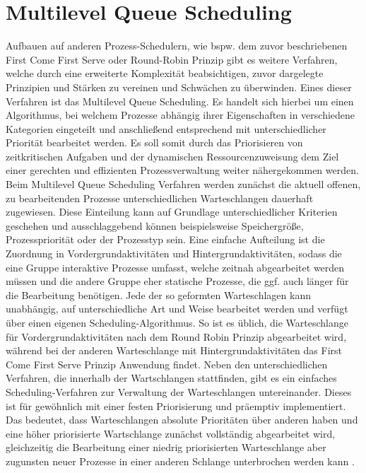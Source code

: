 
\section{Multilevel Queue Scheduling}
Aufbauen auf anderen Prozess-Schedulern, wie bspw. dem zuvor beschriebenen First Come First Serve oder Round-Robin Prinzip gibt es weitere Verfahren, welche durch eine erweiterte Komplexität beabsichtigen, zuvor dargelegte Prinzipien und Stärken zu vereinen und Schwächen zu überwinden. Eines dieser Verfahren ist das Multilevel Queue Scheduling. Es handelt sich hierbei um einen Algorithmus, bei welchem Prozesse abhängig ihrer Eigenschaften in verschiedene Kategorien eingeteilt und anschließend entsprechend mit unterschiedlicher Priorität bearbeitet werden. Es soll somit durch das Priorisieren von zeitkritischen Aufgaben und der dynamischen Ressourcenzuweisung dem Ziel einer gerechten und effizienten Prozessverwaltung weiter nähergekommen werden.
Beim Multilevel Queue Scheduling Verfahren werden zunächst die aktuell offenen, zu bearbeitenden Prozesse unterschiedlichen Warteschlangen dauerhaft zugewiesen. Diese Einteilung kann auf Grundlage unterschiedlicher Kriterien geschehen und ausschlaggebend können beispielsweise Speichergröße, Prozesspriorität oder der Prozesstyp sein. Eine einfache Aufteilung ist die Zuordnung in Vordergrundaktivitäten und Hintergrundaktivitäten, sodass die eine Gruppe interaktive Prozesse umfasst, welche zeitnah abgearbeitet werden müssen und die andere Gruppe eher statische Prozesse, die ggf. auch länger für die Bearbeitung benötigen. Jede der so geformten Warteschlagen kann unabhängig, auf unterschiedliche Art und Weise bearbeitet werden und verfügt über einen eigenen Scheduling-Algorithmus. So ist es üblich, die Warteschlange für Vordergrundaktivitäten nach dem Round Robin Prinzip abgearbeitet wird, während bei der anderen Warteschlange mit Hintergrundaktivitäten das First Come First Serve Prinzip Anwendung findet. %
Neben den unterschiedlichen Verfahren, die innerhalb der Wartschlangen stattfinden, gibt es ein einfaches Scheduling-Verfahren zur Verwaltung der Warteschlangen untereinander. Dieses ist für gewöhnlich mit einer festen Priorisierung und präemptiv implementiert. Das bedeutet, dass Warteschlangen absolute Prioritäten über anderen haben und eine höher priorisierte Wartschlange zunächst vollständig abgearbeitet wird, gleichzeitig die Bearbeitung einer niedrig priorisierten Warteschlange aber zugunsten neuer Prozesse in einer anderen Schlange unterbrochen werden kann \cite[S.214 f.]{Silberschatz.2019}.

